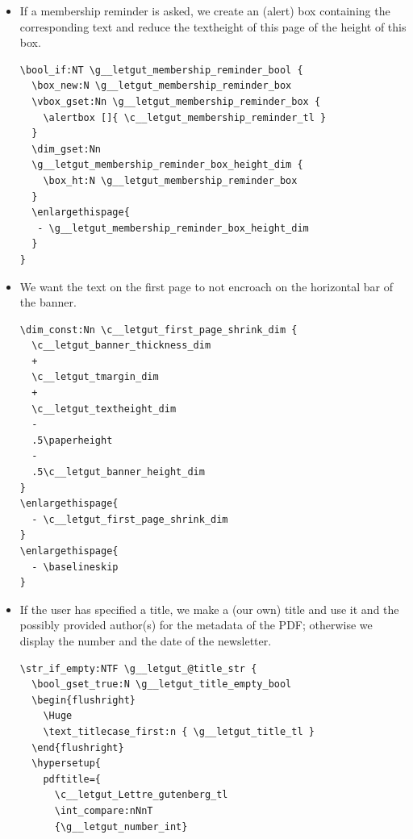 \documentclass{letgut}
\begin{document}
\begin{itemize}
\item If a membership reminder is asked, we create an (alert) box containing the
corresponding text and reduce the textheight of this page of the height of
this box.
\begin{lstlisting}
\bool_if:NT \g__letgut_membership_reminder_bool {
  \box_new:N \g__letgut_membership_reminder_box
  \vbox_gset:Nn \g__letgut_membership_reminder_box {
    \alertbox []{ \c__letgut_membership_reminder_tl }
  }
  \dim_gset:Nn
  \g__letgut_membership_reminder_box_height_dim {
    \box_ht:N \g__letgut_membership_reminder_box
  }
  \enlargethispage{
   - \g__letgut_membership_reminder_box_height_dim
  }
}
\end{lstlisting}
\item We want the text on the first page to not encroach on the horizontal bar of
the banner.
\begin{lstlisting}
\dim_const:Nn \c__letgut_first_page_shrink_dim {
  \c__letgut_banner_thickness_dim
  +
  \c__letgut_tmargin_dim
  +
  \c__letgut_textheight_dim
  -
  .5\paperheight
  -
  .5\c__letgut_banner_height_dim
}
\enlargethispage{
  - \c__letgut_first_page_shrink_dim
}
\enlargethispage{
  - \baselineskip
}
\end{lstlisting}
\item If the user has specified a title, we make a (our own) title and use it and
the possibly provided author(s) for the metadata of the PDF; otherwise we
display the number and the date of the newsletter.
\begin{lstlisting}
\str_if_empty:NTF \g__letgut_@title_str {
  \bool_gset_true:N \g__letgut_title_empty_bool
  \begin{flushright}
    \Huge
    \text_titlecase_first:n { \g__letgut_title_tl }
  \end{flushright}
  \hypersetup{
    pdftitle={
      \c__letgut_Lettre_gutenberg_tl
      \int_compare:nNnT
      {\g__letgut_number_int}
\end{lstlisting}
\end{itemize}
\end{document}
